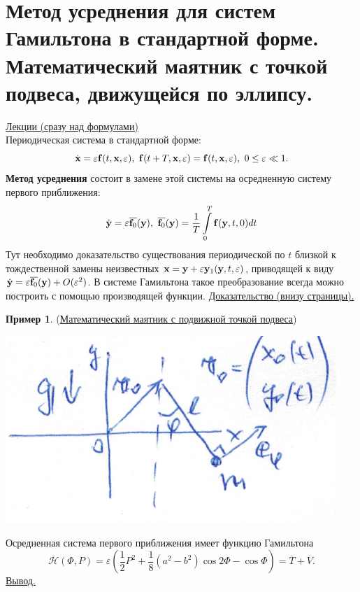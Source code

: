 \documentclass[specialist, subf, href, colorlinks=true, 12pt, times, mtpro, final]{disser}
\theoremstyle{definition}
\newtheorem{example}{Пример}[section]
\def\bfxd{\dot{\bfx}}
\def\bfyd{\dot{\bfy}}
\begin{document}
    \section{Метод усреднения для систем Гамильтона в стандартной форме. Математический маятник с точкой подвеса, движущейся по эллипсу.}
     \label{26}
    \hyperlink {lects.47}{Лекции (сразу над формулами)} \\
    Периодическая система в стандартной форме:
    $$
    \bfxd = \varepsilon\bff(t,\bfx,\varepsilon),\,\, \bff(t+T,\bfx,\varepsilon)=\bff(t,\bfx,\varepsilon),\,\,0\le\varepsilon\ll1.
    $$
    {\bf Метод усреднения} состоит в замене этой системы на осредненную систему первого
    приближения:
    $$
    \bfyd = \varepsilon\overline{\bff_0}(\bfy),\,\,\overline{\bff_0}(\bfy)=\frac{1}{T}
    \int\limits_0^T \bff(\bfy,t,0)dt
    $$
    Тут необходимо доказательство существования периодической по $t$ близкой к тождественной замены
    неизвестных $\mathbf{x} = \mathbf{y} + \varepsilon\mathbf{y}_1(\mathbf{y},t,\varepsilon)$, приводящей к виду
    $\bfyd = \varepsilon\overline{\bff_0}(\bfy) + O(\varepsilon^2)$. В системе Гамильтона
    такое преобразование всегда можно построить с помощью производящей функции.
    \hyperlink{lects.47}{Доказательство (внизу страницы).}
    \begin{example} (\hyperlink{lects.49}{Математический маятник с подвижной точкой подвеса})\\
    \begin{center}
    \includegraphics[scale=0.35]{pics/26}
    \end{center}
    Осредненная система первого приближения имеет функцию Гамильтона
    $$
    \overline{\mathcal{H}}(\Phi,P) = \varepsilon\left(\frac{1}{2}P^2 + \frac{1}{8}(a^2-b^2)\cos2\Phi - \cos\Phi\right) = \overline{T} + \overline{V}.
    $$
    \hyperlink{lects.49}{Вывод.}
    \end{example}
    
    
    
\end{document}
